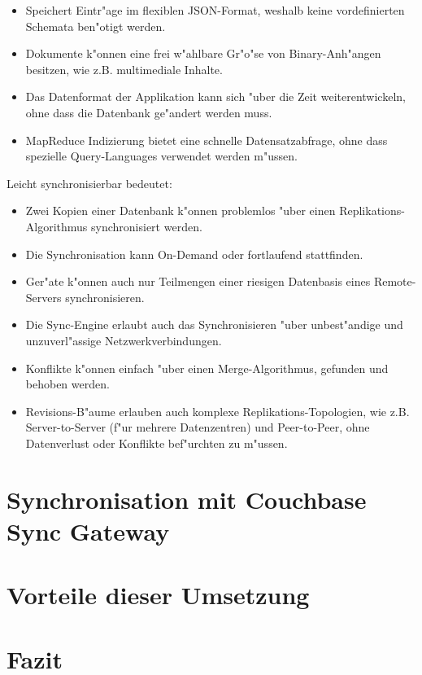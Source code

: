 \documentclass[a4paper,12pt]{scrreprt}
\begin{document}
\begin{itemize}
\item Speichert Eintr"age im flexiblen JSON-Format, weshalb keine vordefinierten Schemata ben"otigt werden.
\item Dokumente k"onnen eine frei w"ahlbare Gr"o"se von Binary-Anh"angen besitzen, wie z.B. multimediale Inhalte.
\item Das Datenformat der Applikation kann sich "uber die Zeit weiterentwickeln, ohne dass die Datenbank ge"andert werden muss.
\item MapReduce Indizierung bietet eine schnelle Datensatzabfrage, ohne dass spezielle Query-Languages verwendet werden m"ussen.
\end{itemize}
Leicht synchronisierbar bedeutet:
\begin{itemize}
\item Zwei Kopien einer Datenbank k"onnen problemlos "uber einen Replikations-Algorithmus synchronisiert werden.
\item Die Synchronisation kann On-Demand oder fortlaufend stattfinden.
\item Ger"ate k"onnen auch nur Teilmengen einer riesigen Datenbasis eines Remote-Servers synchronisieren.
\item Die Sync-Engine erlaubt auch das Synchronisieren "uber unbest"andige und unzuverl"assige Netzwerkverbindungen.
\item Konflikte k"onnen einfach "uber einen Merge-Algorithmus, gefunden und behoben werden.
\item Revisions-B"aume erlauben auch komplexe Replikations-Topologien, wie z.B. Server-to-Server (f"ur mehrere Datenzentren) und Peer-to-Peer, ohne Datenverlust oder Konflikte bef"urchten zu m"ussen.
\end{itemize}
\cite{couch1}
\section{Synchronisation mit Couchbase Sync Gateway}
\section{Vorteile dieser Umsetzung}
\section{Fazit}

\end{document}
